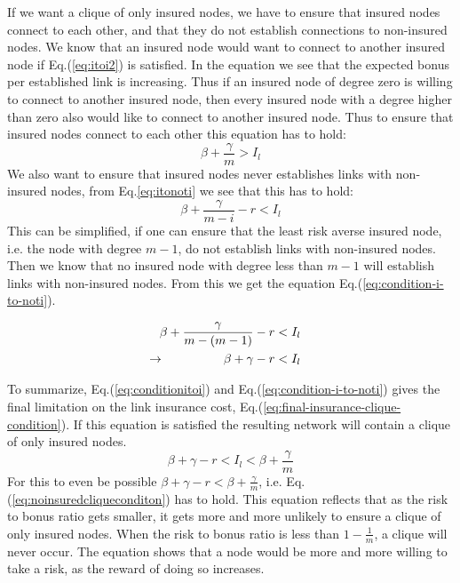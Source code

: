 If we want a clique of only insured nodes, we have to ensure that insured nodes connect to each other, and that they do not establish connections to non-insured nodes.
We know that an insured node would want to connect to another insured node if  Eq.(\ref{eq:itoi2}) is satisfied. 
In the equation we see that the expected bonus per established link is increasing. Thus if an insured node of degree zero is willing to connect to another insured node, then every insured node with a degree higher than zero also would like to connect to another insured node. Thus to ensure that insured nodes connect to each other this equation has to hold:
\begin{equation}
\beta+\frac{\gamma}{m}>I_{l}
\label{eq:conditionitoi}
\end{equation}
We also want to ensure that insured nodes never establishes links with non-insured nodes, from Eq.\ref{eq:itonoti} we see that this has to hold:
\begin{equation}
\beta+\frac{\gamma}{m-i}-r < I_{l}
\label{eq:conditionitonoti}
\end{equation}
This can be simplified, if one can ensure that the least risk averse insured node, i.e. the node with degree $m-1$, do not establish links with non-insured nodes. Then we know that no insured node with degree less than $m-1$ will establish links with non-insured nodes. From this we get the equation Eq.(\ref{eq:condition-i-to-noti}).

\begin{eqnarray}
\beta+\frac{\gamma}{m-(m-1)}-r&<I_{l} \nonumber\\
\llap{$\rightarrow$\hspace{50pt}} \beta+\gamma-r&<I_{l}
\label{eq:condition-i-to-noti}
\end{eqnarray}

To summarize, Eq.(\ref{eq:conditionitoi}) and Eq.(\ref{eq:condition-i-to-noti}) gives the final limitation on the link insurance cost, Eq.(\ref{eq:final-insurance-clique-condition}). If this equation is satisfied the resulting network will contain a clique of only insured nodes.
\begin{equation}
\beta+\gamma-r<I_{l}<\beta+\frac{\gamma}{m}
\label{eq:final-insurance-clique-condition}
\end{equation}
For this to even be possible $\beta+\gamma-r<\beta+\frac{\gamma}{m}$, i.e. Eq.(\ref{eq:noinsuredcliqueconditon}) has to hold. This equation reflects that as the risk to bonus ratio gets smaller, it gets more and more unlikely to ensure a clique of only insured nodes. When the risk to bonus ratio is less than $1-\frac{1}{m}$, a clique will never occur. The equation shows that a node would be more and more willing to take a risk, as the reward of doing so increases.

